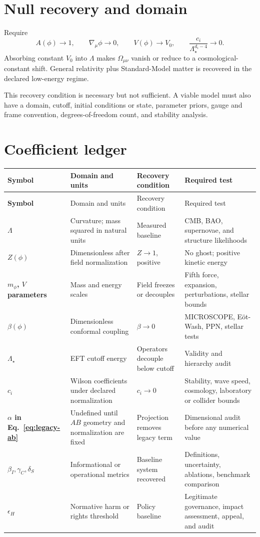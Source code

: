 \documentclass[11pt]{article}
\begin{document}
\section{Null recovery and domain}

Require
\begin{equation}
A(\phi)\rightarrow1,\qquad
\nabla_\mu\phi\rightarrow0,\qquad
V(\phi)\rightarrow V_0,\qquad
\frac{c_i}{\Lambda_\star^{d_i-4}}\rightarrow0.
\end{equation}
Absorbing constant $V_0$ into $\Lambda$ makes $\Omega_{\mu\nu}$ vanish or reduce to a cosmological-constant shift. General relativity plus Standard-Model matter is recovered in the declared low-energy regime.

This recovery condition is necessary but not sufficient. A viable model must also have a domain, cutoff, initial conditions or state, parameter priors, gauge and frame convention, degrees-of-freedom count, and stability analysis.

\section{Coefficient ledger}

\small
\begin{longtable}{>{\bfseries}p{0.75in} p{1.45in} p{1.45in} p{1.95in}}
\toprule
Symbol & Domain and units & Recovery condition & Required test \\
\midrule
\endfirsthead
\toprule
Symbol & Domain and units & Recovery condition & Required test \\
\midrule
\endhead
$\Lambda$ & Curvature; mass squared in natural units & Measured baseline & CMB, BAO, supernovae, and structure likelihoods \\
$Z(\phi)$ & Dimensionless after field normalization & $Z\to1$, positive & No ghost; positive kinetic energy \\
$m_\phi$, $V$ parameters & Mass and energy scales & Field freezes or decouples & Fifth force, expansion, perturbations, stellar bounds \\
$\beta(\phi)$ & Dimensionless conformal coupling & $\beta\to0$ & MICROSCOPE, E\"ot-Wash, PPN, stellar tests \\
$\Lambda_\star$ & EFT cutoff energy & Operators decouple below cutoff & Validity and hierarchy audit \\
$c_i$ & Wilson coefficients under declared normalization & $c_i\to0$ & Stability, wave speed, cosmology, laboratory or collider bounds \\
$\alpha$ in Eq.~\eqref{eq:legacy-ab} & Undefined until $AB$ geometry and normalization are fixed & Projection removes legacy term & Dimensional audit before any numerical value \\
$\beta_I,\gamma_C,\delta_S$ & Informational or operational metrics & Baseline system recovered & Definitions, uncertainty, ablations, benchmark comparison \\
$\epsilon_H$ & Normative harm or rights threshold & Policy baseline & Legitimate governance, impact assessment, appeal, and audit \\
\bottomrule
\end{longtable}
\normalsize
\end{document}
